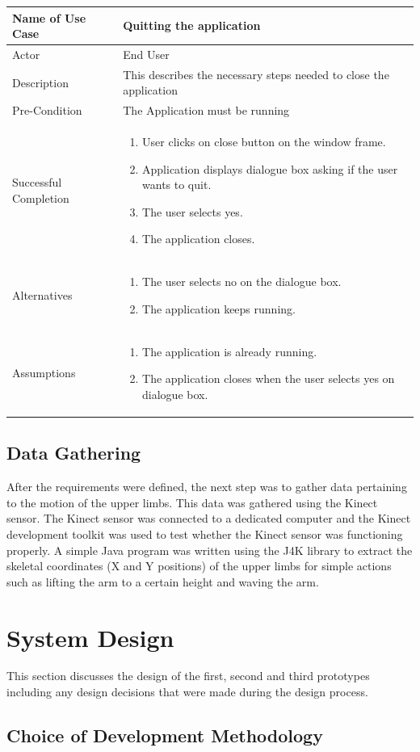 \documentclass[a4paper, 12pt]{article}
\newcommand\addrow[2]{#1 &#2\\ }
\newcommand\addheading[2]{#1 &#2\\ \hline}
\newcommand\tabularhead{\begin{tabular}{lp{8cm}}
\hline
}
\newcommand\addmulrow[2]{ \begin{minipage}[t][][t]{2.5cm}#1\end{minipage}%
   &\begin{minipage}[t][][t]{8cm}
    \begin{enumerate} #2   \end{enumerate}
    \end{minipage}\\ }
\newenvironment{usecase}{\tabularhead}
{\hline\end{tabular}}
\begin{document}
\begin{usecase}
	\addheading{Name of Use Case}{Quitting the application}
	\addrow{Actor}{End User}
	\addrow{Description}{This describes the necessary steps needed to close the application}
	\addrow{Pre-Condition}{The Application must be running}
	\addmulrow{Successful Completion}{
		\item User clicks on close button on the window frame. 
		\item Application displays dialogue box asking if the user wants to quit.  
		\item The user selects yes.
		\item The application closes.}
	\addmulrow{Alternatives}{
	\item The user selects no on the dialogue box. 
	\item The application keeps running.}
	\addmulrow{Assumptions}{
	\item The application is already running. 
	\item The application closes when the user selects yes on dialogue box.}
\end{usecase}




\subsection{ Data Gathering}
After the requirements were defined, the next step was to gather data pertaining to the motion of the upper limbs. This data was gathered using the Kinect sensor. The Kinect sensor was connected to a dedicated computer and the Kinect development toolkit was used to test whether the Kinect sensor was functioning properly. A simple Java program was written using the J4K library to extract the skeletal coordinates (X and Y positions) of the upper limbs for simple actions such as lifting the arm to a certain height and waving the arm. 


\section{System Design} 

This section discusses the design of the first, second and third prototypes including any design decisions that were made during the design process. 

\subsection{Choice of Development Methodology}
\end{document}
